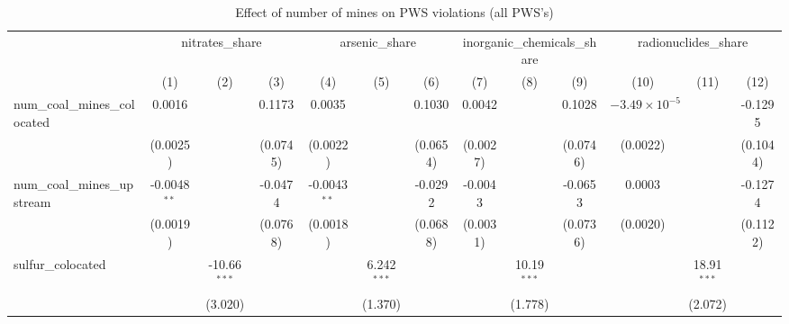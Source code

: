 
\begin{table}[htbp]
   \caption{\label{olsrf2sls_nummine_mine_vio_1985to2005allhucs} Effect of number of mines on PWS violations (all PWS's)}
   \bigskip
   \centering
   \begin{adjustbox}{width = \textwidth, center}
      \begin{tabular}{lcccccccccccc}
         \toprule
          & \multicolumn{3}{c}{nitrates\_share} & \multicolumn{3}{c}{arsenic\_share} & \multicolumn{3}{c}{inorganic\_chemicals\_share} & \multicolumn{3}{c}{radionuclides\_share}\\
                                                            & (1)            & (2)            & (3)           & (4)            & (5)           & (6)           & (7)           & (8)           & (9)           & (10)                   & (11)          & (12)\\  
         \midrule 
         num\_coal\_mines\_colocated                        & 0.0016         &                & 0.1173        & 0.0035         &               & 0.1030        & 0.0042        &               & 0.1028        & $-3.49\times 10^{-5}$  &               & -0.1295\\   
                                                            & (0.0025)       &                & (0.0745)      & (0.0022)       &               & (0.0654)      & (0.0027)      &               & (0.0746)      & (0.0022)               &               & (0.1044)\\   
         num\_coal\_mines\_upstream                         & -0.0048$^{**}$ &                & -0.0474       & -0.0043$^{**}$ &               & -0.0292       & -0.0043       &               & -0.0653       & 0.0003                 &               & -0.1274\\   
                                                            & (0.0019)       &                & (0.0768)      & (0.0018)       &               & (0.0688)      & (0.0031)      &               & (0.0736)      & (0.0020)               &               & (0.1122)\\   
         sulfur\_colocated                                  &                & -10.66$^{***}$ &               &                & 6.242$^{***}$ &               &               & 10.19$^{***}$ &               &                        & 18.91$^{***}$ &   \\   
                                                            &                & (3.020)        &               &                & (1.370)       &               &               & (1.778)       &               &                        & (2.072)       &   \\   

\end{tabular}
\end{adjustbox}
\end{table}
